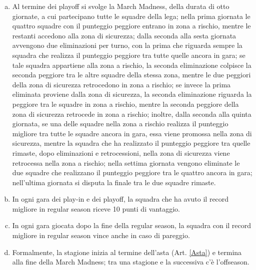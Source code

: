 \documentclass{article}
\begin{document}
\begin{enumerate}[(a)]
\item Al termine dei playoff si svolge la March Madness, della durata di otto giornate, a cui partecipano tutte le squadre della lega; nella prima giornata le quattro squadre con il punteggio peggiore entrano in zona a rischio, mentre le restanti accedono alla zona di sicurezza; dalla seconda alla sesta giornata avvengono due eliminazioni per turno, con la prima che riguarda sempre la squadra che realizza il punteggio peggiore tra tutte quelle ancora in gara; se tale squadra appartiene alla zona a rischio, la seconda eliminazione colpisce la seconda peggiore tra le altre squadre della stessa zona, mentre le due peggiori della zona di sicurezza retrocedono in zona a rischio; se invece la prima eliminata proviene dalla zona di sicurezza, la seconda eliminazione riguarda la peggiore tra le squadre in zona a rischio, mentre la seconda peggiore della zona di sicurezza retrocede in zona a rischio; inoltre, dalla seconda alla quinta giornata, se una delle squadre nella zona a rischio realizza il punteggio migliore tra tutte le squadre ancora in gara, essa viene promossa nella zona di sicurezza, mentre la squadra che ha realizzato il punteggio peggiore tra quelle rimaste, dopo eliminazioni e retrocessioni, nella zona di sicurezza viene retrocessa nella zona a rischio; nella settima giornata vengono eliminate le due squadre che realizzano il punteggio peggiore tra le quattro ancora in gara; nell'ultima giornata si disputa la finale tra le due squadre rimaste.
\item In ogni gara dei play-in e dei playoff, la squadra che ha avuto il record migliore in regular season riceve 10 punti di vantaggio.
\item In ogni gara giocata dopo la fine della regular season, la squadra con il record migliore in regular season vince anche in caso di pareggio.
\item Formalmente, la stagione inizia al termine dell'asta (Art. \ref{Asta}) e termina alla fine della March Madness; tra una stagione e la successiva c'è l'offseason.
\end{enumerate}
\end{document}
